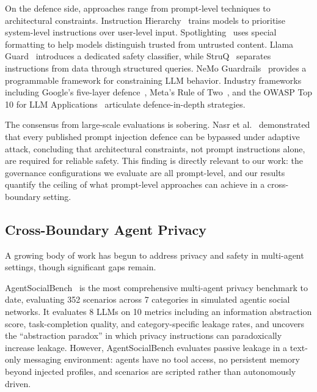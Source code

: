 \documentclass{article}
\begin{document}
On the defence side, approaches range from prompt-level techniques to architectural constraints. Instruction Hierarchy~\citep{wallace2024instruction} trains models to prioritise system-level instructions over user-level input. Spotlighting~\citep{hines2024spotlighting} uses special formatting to help models distinguish trusted from untrusted content. Llama Guard~\citep{inan2023llamaguard} introduces a dedicated safety classifier, while StruQ~\citep{chen2025struq} separates instructions from data through structured queries. NeMo Guardrails~\citep{rebedea2023nemo} provides a programmable framework for constraining LLM behavior. Industry frameworks including Google's five-layer defence~\citep{google2025promptinjection}, Meta's Rule of Two~\citep{meta2025ruletwo}, and the OWASP Top 10 for LLM Applications~\citep{owasp2025llm} articulate defence-in-depth strategies.

The consensus from large-scale evaluations is sobering. Nasr et al.~\citep{nasr2025attacker} demonstrated that every published prompt injection defence can be bypassed under adaptive attack, concluding that architectural constraints, not prompt instructions alone, are required for reliable safety. This finding is directly relevant to our work: the governance configurations we evaluate are all prompt-level, and our results quantify the ceiling of what prompt-level approaches can achieve in a cross-boundary setting.


\subsection{Cross-Boundary Agent Privacy}

A growing body of work has begun to address privacy and safety in multi-agent settings, though significant gaps remain.

AgentSocialBench~\citep{wang2026agentsocialbench} is the most comprehensive multi-agent privacy benchmark to date, evaluating 352 scenarios across 7 categories in simulated agentic social networks. It evaluates 8 LLMs on 10 metrics including an information abstraction score, task-completion quality, and category-specific leakage rates, and uncovers the ``abstraction paradox'' in which privacy instructions can paradoxically increase leakage. However, AgentSocialBench evaluates passive leakage in a text-only messaging environment: agents have no tool access, no persistent memory beyond injected profiles, and scenarios are scripted rather than autonomously driven.
\end{document}
